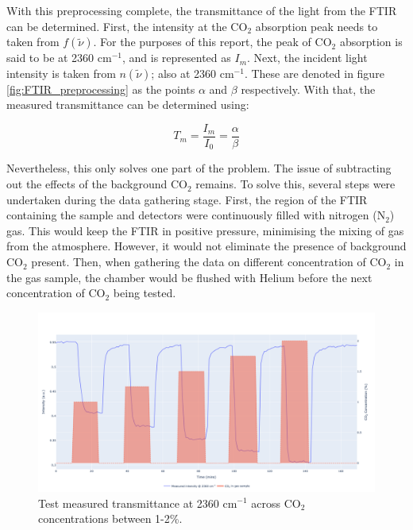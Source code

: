  With this preprocessing complete, the transmittance of the light from the FTIR can be determined. First, the intensity at the CO$_2$ absorption peak needs to taken from $f(\tilde{\nu})$. For the purposes of this report, the peak of CO$_2$ absorption is said to be at 2360 cm$^{-1}$, and is represented as $I_m$. Next, the incident light intensity is taken from $n(\tilde{\nu})$; also at 2360 cm$^{-1}$. These are denoted in figure \ref{fig:FTIR_preprocessing} as the points $\alpha$ and $\beta$ respectively. With that, the measured transmittance can be determined using:

\begin{equation}
    T_m = \frac{I_m}{I_0} = \frac{\alpha}{\beta}
    \label{eq:measured_transmittance}
\end{equation}

Nevertheless, this only solves one part of the problem. The issue of subtracting out the effects of the background CO$_2$ remains. To solve this, several steps were undertaken during the data gathering stage. First, the region of the FTIR containing the sample and detectors were continuously filled with nitrogen (N$_2$) gas. This would keep the FTIR in positive pressure, minimising the mixing of gas from the atmosphere. However, it would not eliminate the presence of background CO$_2$ present. Then, when gathering the data on different concentration of CO$_2$ in the gas sample, the chamber would be flushed with Helium before the next concentration of CO$_2$ being tested. 

\begin{figure}[h!]
	\centering
	\includegraphics[width=1\linewidth]{chapter_4/figures/time_series_plot_of_transmittance.png}
	\caption{Test measured transmittance at 2360 cm$^{-1}$ across CO$_2$ concentrations between 1-2\%.}
	\label{fig:time_series_plot_of_transmittance}
\end{figure}

